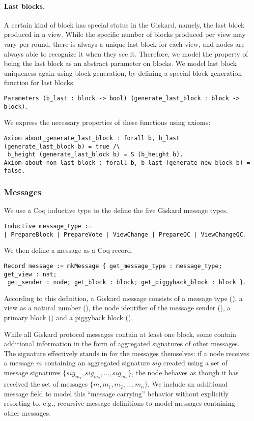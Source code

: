 \documentclass{easychair}
\begin{document}
\paragraph{Last blocks.}
%
A certain kind of block has special status in the Giskard, namely, the last block produced in a view. While the specific number of blocks produced per view may vary per round, there is always a unique last block for each view, and nodes are always able to recognize it when they see it. Therefore, we model the property of being the last block as an abstract parameter on blocks. We model last block uniqueness again using block generation, by defining a special block generation function for last blocks. 
\begin{lstlisting}[language=Coq] 
Parameters (b_last : block -> bool) (generate_last_block : block -> block). 
\end{lstlisting} 
We express the necessary properties of these functions using axioms:
\begin{lstlisting}[language=Coq]
Axiom about_generate_last_block : forall b, b_last (generate_last_block b) = true /\
 b_height (generate_last_block b) = S (b_height b).
Axiom about_non_last_block : forall b, b_last (generate_new_block b) = false.
\end{lstlisting} 

\subsubsection{Messages}
We use a Coq inductive type to the define the five Giskard message types.
\begin{lstlisting}[language=Coq]
Inductive message_type := 
| PrepareBlock | PrepareVote | ViewChange | PrepareQC | ViewChangeQC.
\end{lstlisting}
We then define a message as a Coq record:
\begin{lstlisting}[language=Coq]
Record message := mkMessage { get_message_type : message_type;  get_view : nat;
 get_sender : node; get_block : block; get_piggyback_block : block }.
\end{lstlisting}
According to this definition, a Giskard message consists of a message type (), a view as a natural number (), the node identifier of the message sender (), a primary block () and a piggyback block ().

While all Giskard protocol messages contain at least one block, some contain additional information in the form of aggregated signatures of other messages. The signature effectively stands in for the messages themselves: if a node receives a message $m$ containing an aggregated signature $sig$ created using a set of message signatures $\{sig_{m_1}, sig_{m_2}, ..., sig_{m_n}\}$, the node behaves as though it has received the set of messages $\{m, m_1, m_2, ..., m_n\}$. We include an additional message field to model this ``message carrying'' behavior without explicitly resorting to, e.g., recursive message definitions to model messages containing other messages.
\end{document}
